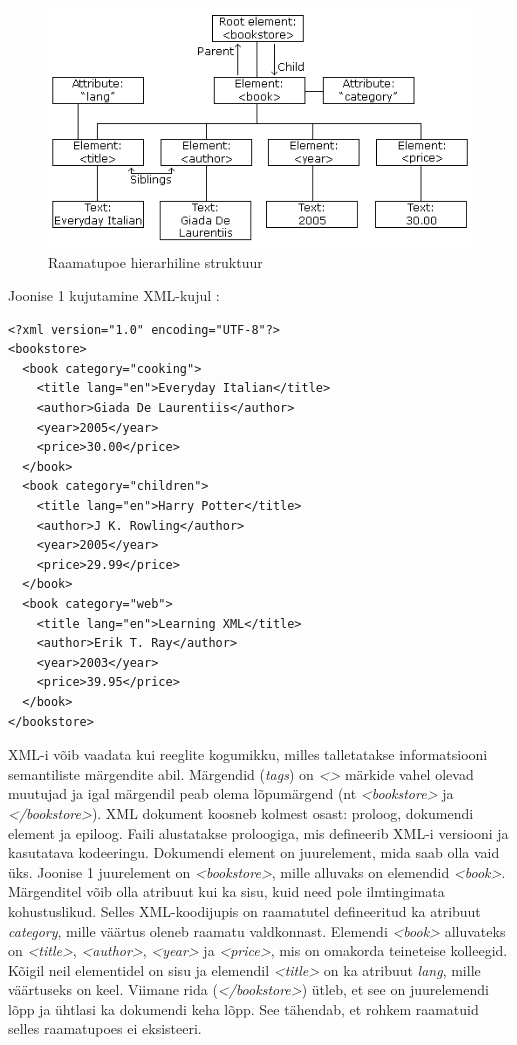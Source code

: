 \documentclass[12pt]{article}
\begin{document}
\begin{figure}[h]
\centering
\includegraphics[width=\textwidth]{figures/nodetree}
\caption{Raamatupoe hierarhiline struktuur \citep{XML}}
\end{figure}

Joonise 1 kujutamine XML-kujul \citep{XML}:\\


\begin{lstlisting}
<?xml version="1.0" encoding="UTF-8"?>
<bookstore>
  <book category="cooking">
    <title lang="en">Everyday Italian</title>
    <author>Giada De Laurentiis</author>
    <year>2005</year>
    <price>30.00</price>
  </book>
  <book category="children">
    <title lang="en">Harry Potter</title>
    <author>J K. Rowling</author>
    <year>2005</year>
    <price>29.99</price>
  </book>
  <book category="web">
    <title lang="en">Learning XML</title>
    <author>Erik T. Ray</author>
    <year>2003</year>
    <price>39.95</price>
  </book>
</bookstore>
\end{lstlisting}

XML-i võib vaadata kui reeglite kogumikku, milles talletatakse informatsiooni semantiliste märgendite abil. Märgendid (\emph{tags}) on \emph{<>} märkide vahel olevad muutujad ja igal märgendil peab olema lõpumärgend (nt \emph{<bookstore>} ja \emph{</bookstore>}). XML dokument koosneb kolmest osast: proloog, dokumendi element ja epiloog. Faili alustatakse proloogiga, mis defineerib XML-i versiooni ja kasutatava kodeeringu. Dokumendi element on juurelement, mida saab olla vaid üks. Joonise 1 juurelement on \emph{<bookstore>}, mille alluvaks on elemendid \emph{<book>}. Märgenditel võib olla atribuut kui ka sisu, kuid need pole ilmtingimata kohustuslikud. Selles XML-koodijupis on raamatutel defineeritud ka atribuut \emph{category}, mille väärtus oleneb raamatu valdkonnast. Elemendi \emph{<book>} alluvateks on \emph{<title>}, \emph{<author>}, \emph{<year>} ja \emph{<price>}, mis on omakorda teineteise kolleegid. Kõigil neil elementidel on sisu ja elemendil \emph{<title>} on ka atribuut \emph{lang}, mille väärtuseks on keel. Viimane rida (\emph{</bookstore>}) ütleb, et see on juurelemendi lõpp ja ühtlasi ka dokumendi keha lõpp. See tähendab, et rohkem raamatuid selles raamatupoes ei eksisteeri. \citep{XML}
\end{document}
